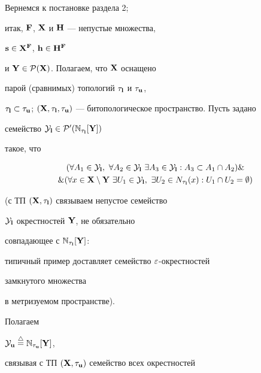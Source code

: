 Вернемся к постановке раздела 2;


итак, ${\bold F}$, ${\bold X}$ и ${\bold H}$ --- непустые множества,


${\bold s} \in {{\bold X}^{\bold F}}$, ${\bold h} \in {{\bold H}^{\bold F}}$


и ${\bold Y} \in {{\cal P}({\bold X})}$. Полагаем, что ${\bold X}$ оснащено


парой (сравнимых) топологий ${\tau}_{\bold l}$ и ${\tau}_{\bold u}$,


${\tau}_{\bold l} \subset {\tau}_{\bold u}$; $({\bold X},{{\tau}_{\bold l}},


{{\tau}_{\bold u}})$ --- битопологическое пространство. Пусть задано


семейство ${{\cal Y}_{\bold l}} \in


{{\cal P}'({{\Bbb N}_{{\tau}_{\bold l}}}[{\bold Y}]})$


такое, что


\begin{multline}


(\fo{A_1} \in {{\cal Y}_{\bold l}},\ \fo{A_2} \in {{\cal Y}_{\bold l}}


\ \exi{A_3} \in {{\cal Y}_{\bold l}}:{A_3} \subset {A_1} \cap


{A_2}) \& \\


\& (\fo{x} \in {\bold X} \setminus {\bold Y}\ \exi{U_1} \in


{{\cal Y}_{\bold l}},


\ \exi{U_2} \in {N_{{\tau}_{\bold l}}}(x):


{U_1} \cap {U_2} = \emp)


\end{multline}


(с ТП $({\bold X},{{\tau}_{\bold l}})$ связываем непустое семейство


${\cal Y}_{\bold l}$ окрестностей ${\bold Y}$, не обязательно


совпадающее с ${{\Bbb N}_{{\tau}_{\bold l}}}[{\bold Y}]$:


типичный пример доставляет семейство $\varepsilon$-окрестностей


замкнутого множества


в метризуемом пространстве).


Полагаем


${{\cal Y}_{\bold u}} \overset{\triangle}{=}{} {{\Bbb N}_{{\tau}_{\bold u}}}[{\bold Y}]$,


связывая с ТП $({\bold X},{{\tau}_{\bold u}})$ семейство всех окрестностей


